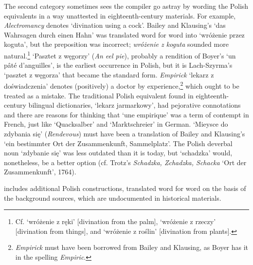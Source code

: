 \documentclass[output=paper,colorlinks,citecolor=brown,arabicfont,chinesefont]{langscibook}
\begin{document}
The second category sometimes sees the compiler go astray by wording the Polish equivalents in a way unattested in eighteenth-century materials. For example, \emph{Alectromancy} denotes ‘divination using a cock’. Bailey and Klausing’s ‘das Wahrsagen durch einen Hahn’ was translated word for word into ‘wróżenie przez koguta’, but the preposition was incorrect; \emph{wróżenie z koguta} \citep[117]{Osinski_alojzy1806} sounded more natural.\footnote{Cf. ‘wróżenie z ręki’ [divination from the palm], ‘wróżenie z rzeczy’ [divination from things], and ‘wróżenie z roślin’ [divination from plants].} ‘Pasztet z węgorzy’ (\emph{An eel pie}), probably a rendition of Boyer’s ‘un pâté d’anguilles’, is the earliest occurrence in Polish, but it is Lach-Szyrma’s ‘pasztet z węgorza’ that became the standard form. \emph{Empirick} ‘lekarz z doświadczenia’ denotes (positively) a doctor by experience,\footnote{\emph{Empirick} must have been borrowed from Bailey and Klausing, as Boyer has it in the spelling \emph{Empiric}.} which ought to be treated as a mistake. The traditional Polish equivalent found in eighteenth-century bilingual dictionaries, ‘lekarz jarmarkowy’, had pejorative connotations and there are reasons for thinking that ‘une empirique’ was a term of contempt in French, just like ‘Quacksalber’ and ‘Marktschreier’ in German. ‘Mieysce do zdybania się’ (\emph{Rendevous}) must have been a translation of Bailey and Klausing’s ‘ein bestimmter Ort der Zusammenkunft, Sammelplatz’. The Polish deverbal noun ‘zdybanie się’ was less outdated than it is today, but ‘schadzka’ would, nonetheless, be a better option (cf. Trotz’s \emph{Schadzka, Zchadzka, Schacka} ‘Ort der Zusammenkunft’, 1764). 

   includes additional Polish constructions, translated word for word on the basis of the background sources, which are undocumented in historical materials.
\end{document}
